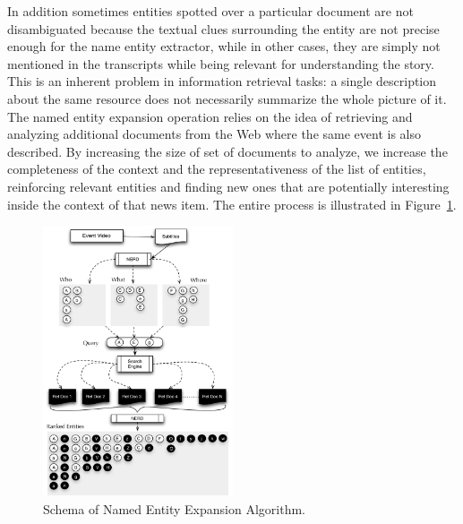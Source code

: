 \documentclass[a4paper,11pt]{report}
\begin{document}
In addition sometimes entities spotted over a particular document are not disambiguated because the textual clues surrounding the entity are not precise enough for the name entity extractor, while in other cases, they are simply not mentioned in the transcripts while being relevant for understanding the story. This is an inherent problem in information retrieval tasks: a single description about the same resource does not necessarily summarize the whole picture of it. The named entity expansion operation relies on the idea of retrieving and analyzing additional documents from the Web where the same event is also described. By increasing the size of set of documents to analyze, we increase the completeness of the context and the representativeness of the list of entities, reinforcing relevant entities and finding new ones that are potentially interesting inside the context of that news item. The entire process is illustrated in Figure~\ref{fig:namedEntityExpansion}.

\begin{figure}[h!]
\centering
\includegraphics[width=0.5\textwidth]{figure/ExpansionDiagram}
\caption{Schema of Named Entity Expansion Algorithm.}
\label{fig:namedEntityExpansion}%
\end{figure}
\end{document}
